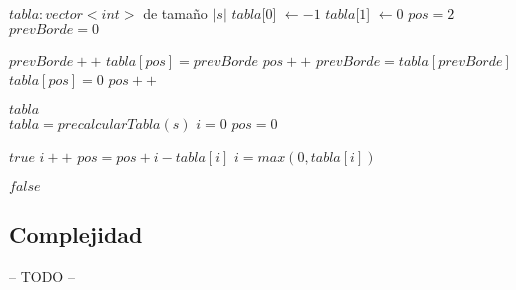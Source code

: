 \begin{algorithmic}

    \State $tabla : vector<int>$ de tamaño $|s|$
    \State $tabla$[$0$] $\gets -1$
    \State $tabla$[$1$] $\gets 0$
    \State $pos = 2$
    \State $prevBorde = 0$

            \State $prevBorde++$
            \State $tabla[pos] = prevBorde$
            \State $pos++$
            \State $prevBorde = tabla[prevBorde]$
        \Else
            \State $tabla[pos] = 0$
            \State $pos++$
        \EndIf
    \EndWhile

    \State \Return $tabla$
\EndFunction
\\

    \State $tabla = precalcularTabla(s)$
    \State $i = 0$
    \State $pos = 0$

                \State \Return $true$
            \EndIf
            \State $i++$
        \Else
            \State $pos = pos + i - tabla[i]$
            \State $i = max(0, tabla[i])$
        \EndIf
    \EndWhile

    \State \Return $false$
\EndFunction

\subsection{Complejidad}

-- TODO --

\end{algorithmic}

